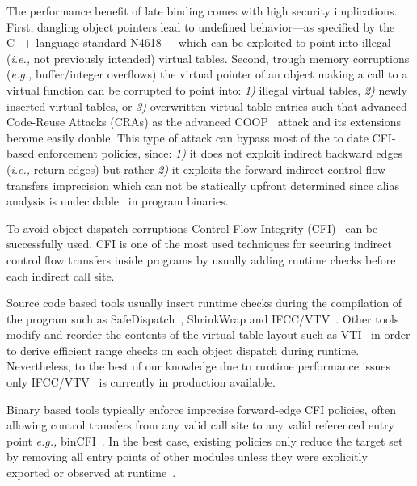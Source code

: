The performance benefit of late binding comes with high security implications. 
First, dangling object pointers lead to undefined behavior---as specified by the C++ language standard N4618~\cite{N4618}---which 
can be exploited to point into illegal (\textit{i.e.,} not previously intended) virtual tables.
Second, trough memory corruptions (\textit{e.g.,} buffer/integer overflows) the virtual pointer of an object making a 
call to a virtual function can be corrupted to point into:
\textit{1)} illegal virtual tables, 
\textit{2)} newly inserted virtual tables, or
\textit{3)} overwritten virtual table entries
such that advanced Code-Reuse Attacks (CRAs) as the advanced COOP~\cite{schuster:coop} attack
and its extensions~\cite{crane:readactor++, crane:readactor++, subversive-c:lettner, ctf:coop, loop:oriented} 
become easily doable. This type of attack can bypass most of the to date CFI-based enforcement policies, since:
\textit{1)} it does not exploit indirect backward edges (\textit{i.e.,} return edges) but rather
\textit{2)} it exploits the forward indirect control flow transfers imprecision which can not be statically upfront 
determined since alias analysis is undecidable~\cite{alias:undecidable} in program binaries.

To avoid object dispatch corruptions Control-Flow Integrity (CFI)~\cite{abadi:cfi2, abadi:cfi} can be successfully used.
CFI is one of the most used techniques for securing indirect control flow transfers inside programs
by usually adding runtime checks before each indirect call site.

Source code based tools usually insert runtime checks during the compilation of 
the program such as SafeDispatch~\cite{safedispatch:jang}, ShrinkWrap \cite{haller:shrinkwrap} and IFCC/VTV~\cite{vtv:tice}.
Other tools modify and reorder the contents of the virtual table layout such as VTI~\cite{bounov:interleaving} 
in order to derive efficient range checks on each object dispatch during runtime. Nevertheless, to the best of our knowledge 
due to runtime performance issues only IFCC/VTV~\cite{vtv:tice} is currently in production available.

Binary based tools typically enforce imprecise forward-edge CFI 
policies, often allowing control transfers from any valid call site 
to any valid referenced entry point \textit{e.g.,} binCFI~\cite{ccfir:zhang, zhang:usenix}. 
In the best case, existing policies only reduce the target set by
removing all entry points of other modules unless they were
explicitly exported or observed at runtime~\cite{payer:dimva}. 

